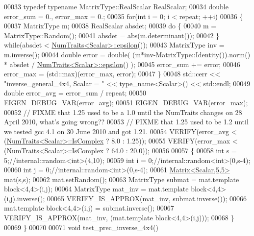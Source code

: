 \begin{DoxyCode}
00033   \textcolor{keyword}{typedef} \textcolor{keyword}{typename} MatrixType::RealScalar RealScalar;
00034   \textcolor{keywordtype}{double} error\_sum = 0., error\_max = 0.;
00035   \textcolor{keywordflow}{for}(\textcolor{keywordtype}{int} i = 0; i < repeat; ++i)
00036   \{
00037     MatrixType m;
00038     RealScalar absdet;
00039     \textcolor{keywordflow}{do} \{
00040       m = MatrixType::Random();
00041       absdet = abs(m.determinant());
00042     \} \textcolor{keywordflow}{while}(absdet < \hyperlink{group___core___module_struct_eigen_1_1_num_traits}{NumTraits<Scalar>::epsilon}());
00043     MatrixType inv = m.\hyperlink{group___core___module_adb9af427f317202366c2832876064eb3}{inverse}();
00044     \textcolor{keywordtype}{double} error = double( (m*inv-MatrixType::Identity()).norm() * absdet / 
      \hyperlink{group___core___module_struct_eigen_1_1_num_traits}{NumTraits<Scalar>::epsilon}() );
00045     error\_sum += error;
00046     error\_max = (std::max)(error\_max, error);
00047   \}
00048   std::cerr << \textcolor{stringliteral}{"inverse\_general\_4x4, Scalar = "} << type\_name<Scalar>() << std::endl;
00049   \textcolor{keywordtype}{double} error\_avg = error\_sum / repeat;
00050   EIGEN\_DEBUG\_VAR(error\_avg);
00051   EIGEN\_DEBUG\_VAR(error\_max);
00052    \textcolor{comment}{// FIXME that 1.25 used to be a 1.0 until the NumTraits changes on 28 April 2010, what's going wrong??}
00053    \textcolor{comment}{// FIXME that 1.25 used to be 1.2 until we tested gcc 4.1 on 30 June 2010 and got 1.21.}
00054   VERIFY(error\_avg < (\hyperlink{group___core___module_struct_eigen_1_1_num_traits}{NumTraits<Scalar>::IsComplex} ? 8.0 : 1.25));
00055   VERIFY(error\_max < (\hyperlink{group___core___module_struct_eigen_1_1_num_traits}{NumTraits<Scalar>::IsComplex} ? 64.0 : 20.0));
00056 
00057   \{
00058     \textcolor{keywordtype}{int} s = 5;\textcolor{comment}{//internal::random<int>(4,10);}
00059     \textcolor{keywordtype}{int} i = 0;\textcolor{comment}{//internal::random<int>(0,s-4);}
00060     \textcolor{keywordtype}{int} j = 0;\textcolor{comment}{//internal::random<int>(0,s-4);}
00061     \hyperlink{group___core___module_class_eigen_1_1_matrix}{Matrix<Scalar,5,5>} mat(s,s);
00062     mat.setRandom();
00063     MatrixType submat = mat.template block<4,4>(i,j);
00064     MatrixType mat\_inv = mat.template block<4,4>(i,j).inverse();
00065     VERIFY\_IS\_APPROX(mat\_inv, submat.inverse());
00066     mat.template block<4,4>(i,j) = submat.inverse();
00067     VERIFY\_IS\_APPROX(mat\_inv, (mat.template block<4,4>(i,j)));
00068   \}
00069 \}
00070 
00071 \textcolor{keywordtype}{void} test\_prec\_inverse\_4x4()

\end{DoxyCode}

